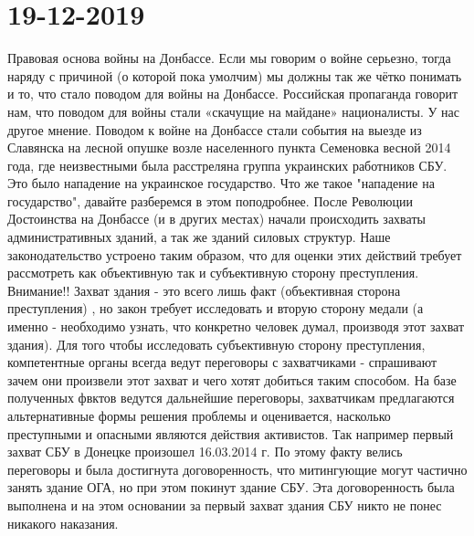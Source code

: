  
 
 
 
 
\section{19-12-2019}

Правовая основа войны на Донбассе.
Если мы говорим о войне серьезно, тогда наряду с причиной (о которой пока умолчим)  мы должны так же чётко понимать и то, что стало поводом для войны на Донбассе. 
Российская пропаганда говорит нам, что поводом для войны стали «скачущие на майдане» националисты. У нас другое мнение.
Поводом к войне на Донбассе стали события на  выезде из Славянска на лесной опушке возле населенного пункта Семеновка весной 2014 года, где неизвестными была расстреляна группа украинских работников СБУ. Это было нападение на украинское государство.  
Что же такое "нападение на государство", давайте разберемся в этом поподробнее.
После Революции Достоинства на Донбассе (и в других местах)  начали происходить захваты административных зданий, а так же зданий силовых структур.  Наше законодательство устроено таким образом, что для оценки этих действий требует рассмотреть как объективную так и субъективную сторону преступления.
Внимание!!   Захват здания - это всего лишь факт (объективная сторона преступления) , но закон требует исследовать и вторую сторону медали (а именно - необходимо узнать, что конкретно человек думал, производя этот захват здания). Для того чтобы исследовать субъективную сторону преступления, компетентные  органы всегда ведут переговоры с захватчиками - спрашивают зачем они произвели этот захват и чего хотят добиться таким способом. На базе полученных фвктов ведутся дальнейшие переговоры, захватчикам предлагаются альтернативные формы решения проблемы и оценивается, насколько преступными и опасными являются действия активистов.
Так например первый захват СБУ в Донецке произошел 16.03.2014 г. По этому факту велись переговоры и была достигнута договоренность, что митингующие могут частично занять здание ОГА, но при этом покинут здание СБУ.  Эта договоренность была выполнена и на этом основании за первый захват здания СБУ никто не понес никакого наказания.  
